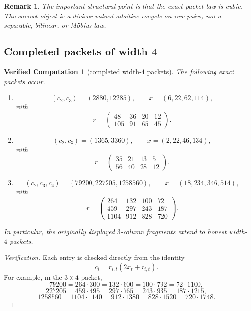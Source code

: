 \documentclass[11pt]{article}
\theoremstyle{plainbreak}
\theoremstyle{defbreak}
\newtheorem{computation}[theorem]{Verified Computation}
\newtheorem{remark}[theorem]{Remark}
\begin{document}
\begin{remark}
The important structural point is that the exact packet law is \emph{cubic}.  The correct object is a divisor-valued additive cocycle on row pairs, not a separable, bilinear, or Möbius law.
\end{remark}

\subsection{Completed packets of width $4$}

\begin{computation}[completed width-$4$ packets]
The following exact packets occur.
\begin{enumerate}[label=\textup{(\roman*)}]
    \item
    \[
    (c_2,c_3)=(2880,12285),\qquad
    x=(6,22,62,114),
    \]
    with
    \[
    r=
    \begin{pmatrix}
    48&36&20&12\\
    105&91&65&45
    \end{pmatrix}.
    \]
    \item
    \[
    (c_2,c_3)=(1365,3360),\qquad
    x=(2,22,46,134),
    \]
    with
    \[
    r=
    \begin{pmatrix}
    35&21&13&5\\
    56&40&28&12
    \end{pmatrix}.
    \]
    \item
    \[
    (c_2,c_3,c_4)=(79200,227205,1258560),\qquad
    x=(18,234,346,514),
    \]
    with
    \[
    r=
    \begin{pmatrix}
    264&132&100&72\\
    459&297&243&187\\
    1104&912&828&720
    \end{pmatrix}.
    \]
\end{enumerate}
In particular, the originally displayed $3$-column fragments extend to honest width-$4$ packets.
\end{computation}

\begin{proof}[Verification]
Each entry is checked directly from the identity
\[
c_i=r_{i,t}(2x_t+r_{i,t}).
\]
For example, in the $3\times 4$ packet,
\[
79200=264\cdot 300=132\cdot 600=100\cdot 792=72\cdot 1100,
\]
\[
227205=459\cdot 495=297\cdot 765=243\cdot 935=187\cdot 1215,
\]
\[
1258560=1104\cdot 1140=912\cdot 1380=828\cdot 1520=720\cdot 1748.
\]
\end{proof}
\end{document}
